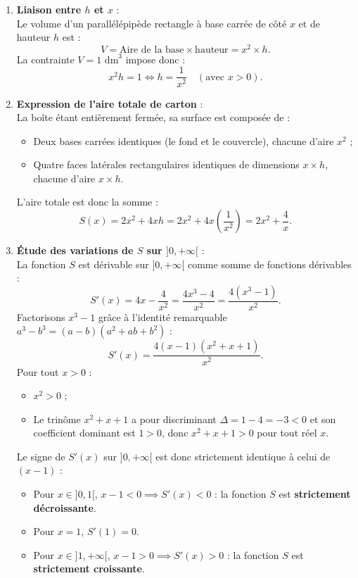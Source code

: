 \documentclass[11pt,a4paper]{article}
\begin{document}
\begin{correctionbox}
\begin{enumerate}[label=\textbf{\arabic*.}]
    \item \textbf{Liaison entre $h$ et $x$} :\\
    Le volume d'un parallélépipède rectangle à base carrée de côté $x$ et de hauteur $h$ est :
    \[
    V = \text{Aire de la base} \times \text{hauteur} = x^2 \times h.
    \]
    La contrainte $V = 1\text{ dm}^3$ impose donc :
    \[
    x^2 h = 1 \iff h = \frac{1}{x^2} \quad (\text{avec } x > 0).
    \]

    \item \textbf{Expression de l'aire totale de carton} :\\
    La boîte étant entièrement fermée, sa surface est composée de :
    \begin{itemize}
        \item Deux bases carrées identiques (le fond et le couvercle), chacune d'aire $x^2$ ;
        \item Quatre faces latérales rectangulaires identiques de dimensions $x \times h$, chacune d'aire $x \times h$.
    \end{itemize}
    L'aire totale est donc la somme :
    \[
    S(x) = 2x^2 + 4xh = 2x^2 + 4x \left(\frac{1}{x^2}\right) = 2x^2 + \frac{4}{x}.
    \]

    \item \textbf{Étude des variations de $S$ sur $]0, +\infty[$} :\\
    La fonction $S$ est dérivable sur $]0, +\infty[$ comme somme de fonctions dérivables :
    \[
    S'(x) = 4x - \frac{4}{x^2} = \frac{4x^3 - 4}{x^2} = \frac{4(x^3 - 1)}{x^2}.
    \]
    Factorisons $x^3 - 1$ grâce à l'identité remarquable $a^3 - b^3 = (a-b)(a^2+ab+b^2)$ :
    \[
    S'(x) = \frac{4(x - 1)(x^2 + x + 1)}{x^2}.
    \]
    Pour tout $x > 0$ :
    \begin{itemize}
        \item $x^2 > 0$ ;
        \item Le trinôme $x^2 + x + 1$ a pour discriminant $\Delta = 1 - 4 = -3 < 0$ et son coefficient dominant est $1 > 0$, donc $x^2 + x + 1 > 0$ pour tout réel $x$.
    \end{itemize}
    Le signe de $S'(x)$ sur $]0, +\infty[$ est donc strictement identique à celui de $(x - 1)$ :
    \begin{itemize}
        \item Pour $x \in ]0, 1[$, $x - 1 < 0 \implies S'(x) < 0$ : la fonction $S$ est \textbf{strictement décroissante}.
        \item Pour $x = 1$, $S'(1) = 0$.
        \item Pour $x \in ]1, +\infty[$, $x - 1 > 0 \implies S'(x) > 0$ : la fonction $S$ est \textbf{strictement croissante}.
    \end{itemize}


\end{enumerate}
\end{correctionbox}
\end{document}
